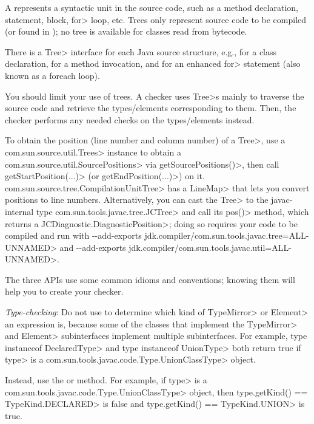 A  represents a syntactic unit in the source code,
such as a method declaration, statement, block, \<for> loop, etc. Trees only
represent source code to be compiled (or found in );
no tree is available for classes read from bytecode.

There is a \<Tree> interface for each Java source structure, e.g.,
 for a class declaration, 
for a method invocation, and  for an enhanced \<for>
statement (also known as a foreach loop).

You should limit your use of trees. A checker uses \<Tree>s mainly to
traverse the source code and retrieve the types/elements corresponding to
them.  Then, the checker performs any needed checks on the types/elements instead.

To obtain the position (line number and column number) of a \<Tree>,
use a \<com.sun.source.util.Trees> instance to obtain a
\<com.sun.source.util.SourcePositions> via \<getSourcePositions()>, then call
\<getStartPosition(...)> (or \<getEndPosition(...)>) on it.
\<com.sun.source.tree.CompilationUnitTree> has a \<LineMap> that lets you convert
positions to line numbers.
Alternatively, you can cast the \<Tree> to the javac-internal type
\<com.sun.tools.javac.tree.JCTree> and call its \<pos()> method, which returns a
\<JCDiagnostic.DiagnosticPosition>; doing so requires your code to be compiled
and run with \<-{}-add-exports jdk.compiler/com.sun.tools.javac.tree=ALL-UNNAMED>
and \<-{}-add-exports jdk.compiler/com.sun.tools.javac.util=ALL-UNNAMED>\@.



The three APIs use some common idioms and conventions; knowing them will
help you to create your checker.

\emph{Type-checking}:
Do not use  to determine which kind of \<TypeMirror> or \<Element> an expression is,
because some of the classes that implement the \<TypeMirror> and \<Element> subinterfaces implement multiple
subinterfaces. For example, \<type instanceof DeclaredType> and \<type instanceof UnionType>
both return true if \<type> is a \<com.sun.tools.javac.code.Type.UnionClassType> object.

Instead, use the
or
method.  For example, if \<type> is a \<com.sun.tools.javac.code.Type.UnionClassType> object, then
\<type.getKind() == TypeKind.DECLARED> is false and \<type.getKind() == TypeKind.UNION> is true.


